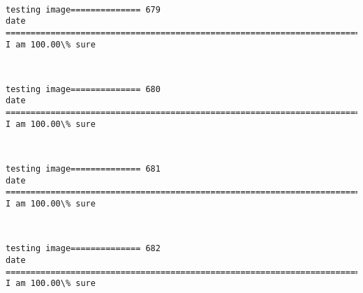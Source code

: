 \documentclass[11pt]{article}
\begin{document}
    \begin{center}
    \end{center}
    { \hspace*{\fill} \\}
    
    \begin{Verbatim}[commandchars=\\\{\}]
testing image============== 679
date
============================================================================
I am 100.00\% sure

    \end{Verbatim}

    \begin{center}
    \end{center}
    { \hspace*{\fill} \\}
    
    \begin{Verbatim}[commandchars=\\\{\}]
testing image============== 680
date
============================================================================
I am 100.00\% sure

    \end{Verbatim}

    \begin{center}
    \end{center}
    { \hspace*{\fill} \\}
    
    \begin{Verbatim}[commandchars=\\\{\}]
testing image============== 681
date
============================================================================
I am 100.00\% sure

    \end{Verbatim}

    \begin{center}
    \end{center}
    { \hspace*{\fill} \\}
    
    \begin{Verbatim}[commandchars=\\\{\}]
testing image============== 682
date
============================================================================
I am 100.00\% sure

    \end{Verbatim}
\end{document}
